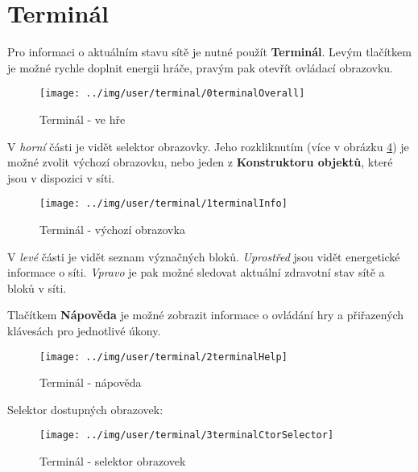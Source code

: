 
\section{Terminál}

Pro informaci o aktuálním stavu sítě je nutné použít \textbf{Terminál}. Levým tlačítkem je možné rychle doplnit energii hráče, pravým pak otevřít ovládací obrazovku.

\begin{figure}[!h]\centering
\texttt{[image: ../img/user/terminal/0terminalOverall]}

\caption{Terminál - ve hře}
\label{fig:user_terminal_0terminalOverall}

\end{figure}

\FloatBarrier

V \textit{horní} části je vidět selektor obrazovky. Jeho rozkliknutím (více v obrázku \ref{fig:user_terminal_3terminalCtorSelector}) je možné zvolit výchozí obrazovku, nebo jeden z \textbf{Konstruktoru objektů}, které jsou v dispozici v síti.




\begin{figure}[!h]\centering
\texttt{[image: ../img/user/terminal/1terminalInfo]}

\caption{Terminál - výchozí obrazovka}
\label{fig:user_terminal_1terminalInfo}

\end{figure}

\FloatBarrier
V \textit{levé} části je vidět seznam význačných bloků. \textit{Uprostřed} jsou vidět energetické informace o síti. \textit{Vpravo} je pak možné sledovat aktuální zdravotní stav sítě a bloků v síti.

Tlačítkem \textbf{Nápověda} je možné zobrazit informace o ovládání hry a přiřazených klávesách pro jednotlivé úkony.

\begin{figure}[!h]\centering
\texttt{[image: ../img/user/terminal/2terminalHelp]}

\caption{Terminál - nápověda}
\label{fig:user_terminal_2terminalHelp}

\end{figure}

\FloatBarrier

Selektor dostupných obrazovek:

\begin{figure}[!h]\centering
\texttt{[image: ../img/user/terminal/3terminalCtorSelector]}

\caption{Terminál - selektor obrazovek}
\label{fig:user_terminal_3terminalCtorSelector}

\end{figure}

